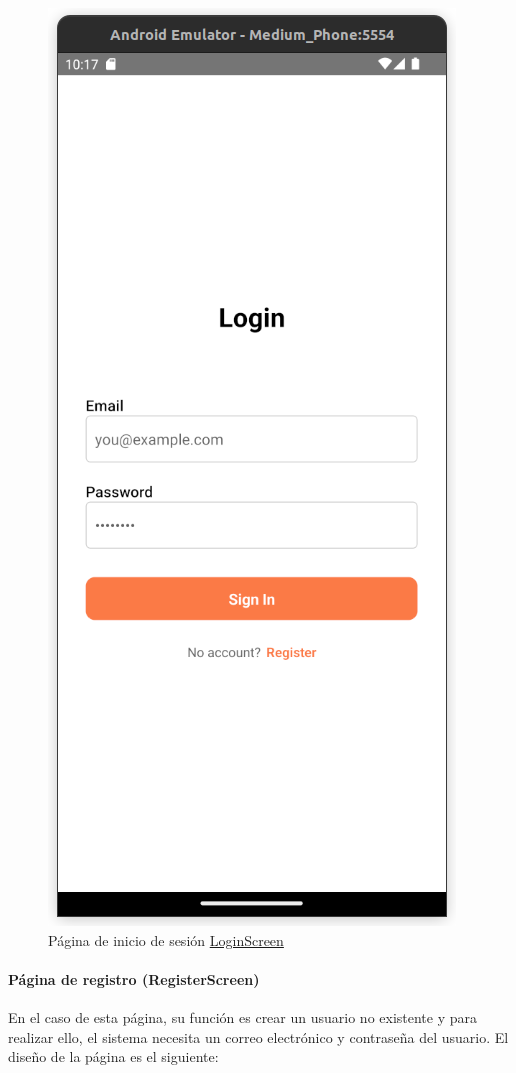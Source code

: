 \documentclass[twoside, openright, 11pt]{report}
\begin{document}
				\begin{figure}[H]
					\centering
					\includegraphics[scale=0.5]{imagenes/LoginScreen}
					\caption{Página de inicio de sesión \hyperref[LoginScreen]{LoginScreen}}
					\label{fig:LoginScreen}
				\end{figure}
			
				
				\paragraph{Página de registro (RegisterScreen)}
					En el caso de esta página, su función es crear un usuario no existente y para realizar ello, el sistema necesita un correo electrónico y contraseña del usuario.
					El diseño de la página es el siguiente:
					
\end{document}
